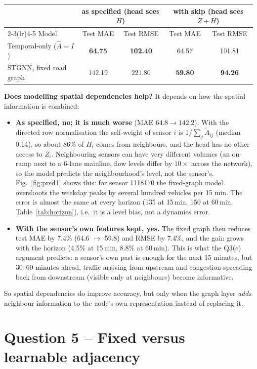\begin{center}
\begin{tabular}{l cc cc}\toprule
& \multicolumn{2}{c}{as specified (head sees $H$)} & \multicolumn{2}{c}{with skip (head sees $Z{+}H$)}\\
\cmidrule(lr){2-3}\cmidrule(lr){4-5}
Model & Test MAE & Test RMSE & Test MAE & Test RMSE\\\midrule
Temporal-only ($\hat A=I$) & \textbf{64.75} & \textbf{102.40} & 64.57 & 101.81\\
STGNN, fixed road graph & 142.19 & 221.80 & \textbf{59.80} & \textbf{94.26}\\\bottomrule
\end{tabular}
\end{center}
\textbf{Does modelling spatial dependencies help?} It depends on how the spatial information is combined:
\begin{itemize}
\item \textbf{As specified, no; it is much worse} (MAE $64.8\to142.2$). With the directed row normalisation the self-weight
of sensor $i$ is $1/\sum_j\tilde A_{ij}$ (median 0.14), so about 86\% of $H_i$ comes from neighbours, and the head has no other
access to $Z_i$. Neighbouring sensors can have very different volumes (an on-ramp next to a 6-lane mainline,
flow levels differ by $10\times$ across the network), so the model predicts the neighbourhood's level, not the sensor's. Fig.~\ref{fig:pred1}
shows this: for sensor 1118170 the fixed-graph model overshoots the weekday peaks by several hundred vehicles per 15 min. The error is almost
the same at every horizon (135 at 15\,min, 150 at 60\,min, Table~\ref{tab:horizon}), i.e.\ it is a level bias, not a dynamics error.
\item \textbf{With the sensor's own features kept, yes.} The fixed graph then reduces test MAE by 7.4\% (64.6 $\to$ 59.8) and RMSE by
7.4\%, and the gain grows with the horizon (4.5\% at 15\,min, 8.8\% at 60\,min). This is what the Q3(c) argument predicts:
a sensor's own past is enough for the next 15 minutes, but 30--60 minutes ahead, traffic arriving from upstream and
congestion spreading back from downstream (visible only at neighbours) become informative.
\end{itemize}
So spatial dependencies do improve accuracy, but only when the graph layer \emph{adds} neighbour information to the node's
own representation instead of replacing it.

\section*{Question 5 -- Fixed versus learnable adjacency}

